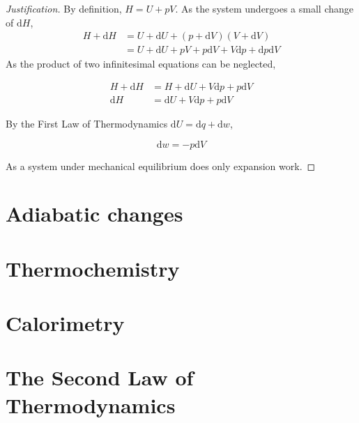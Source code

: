 \documentclass{article}
\numberwithin{theorem}{section}
\numberwithin{corollary}{section}
\numberwithin{postulate}{section}
\numberwithin{lemma}{section}
\numberwithin{definition}{section}
\newenvironment{justification} {\begin{proof}[Justification]} {\end{proof}}
\begin{document}
\begin{justification}
  By definition, $H = U + pV$. As the system undergoes a small change of $\mathrm{d}H$,
  \begin{equation*}
    \begin{split}
      H + \mathrm{d}H & = U + \mathrm{d}U + (p + \mathrm{d}V)(V + \mathrm{d}V) \\
      & = U + \mathrm{d}U + pV + p\mathrm{d}V + V\mathrm{d}p +
      \mathrm{d}p\mathrm{d}V
    \end{split}
  \end{equation*}
  As the product of two infinitesimal equations can be neglected,

  \begin{equation*}
    \begin{split}
      H + \mathrm{d}H & = H + \mathrm{d}U + V\mathrm{d}p + p\mathrm{d}V \\
      \mathrm{d}H & = \mathrm{d}U + V\mathrm{d}p + p\mathrm{d}V
    \end{split}
  \end{equation*}

  By the First Law of Thermodynamics $\mathrm{d}U = \mathrm{d}q + \mathrm{d}w$,

  \begin{equation*}
    \mathrm{d}w = -p\mathrm{d}V
  \end{equation*}

  As a system under mechanical equilibrium does only expansion work.

\end{justification}

\section{Adiabatic changes}

\section{Thermochemistry}

\section{Calorimetry}

\section{The Second Law of Thermodynamics}
\end{document}
